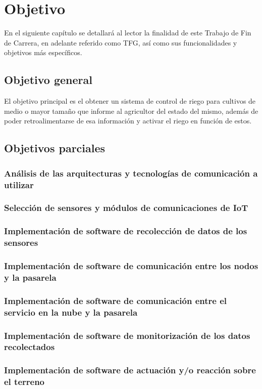 \chapter{Objetivo}
\label{cap:Objetivo}

En el siguiente capítulo se detallará al lector la finalidad de este Trabajo de Fin de Carrera, en adelante referido como TFG, así como sus funcionalidades y objetivos más específicos.

\section{Objetivo general}
\label{sec:general}

El objetivo principal es el obtener un sistema de control de riego para cultivos de medio o mayor tamaño que informe al agricultor del estado del mismo, además de poder retroalimentarse de esa información y activar el riego en función de estos.

\section{Objetivos parciales}
\label{sec:especificos}

\subsection{Análisis de las arquitecturas y tecnologías de comunicación a utilizar}
\label{subsec:analisis_arquitecturas_tecnologias}

\subsection{Selección de sensores y módulos de comunicaciones de IoT}
\label{subsec:seleccion_sensores}

\subsection{Implementación de software de recolección de datos de los sensores}
\label{subsec:implementacion_recoleccion}

\subsection{Implementación de software de comunicación entre los nodos y la pasarela}
\label{subsec:implementacion_comunicacion_sublc}

\subsection{Implementación de software de comunicación entre el servicio en la nube y la pasarela}
\label{subsec:implementacion_comunicacion_subi}

\subsection{Implementación de software de monitorización de los datos recolectados}
\label{subsec:implementacion_monitorizacion}

\subsection{Implementación de software de actuación y/o reacción sobre el terreno}
\label{subsec:implementacion_actuacion}